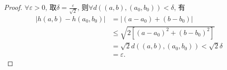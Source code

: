 \begin{proof}
    


    $\forall \varepsilon > 0$, 取$\delta = \frac{\varepsilon}{\sqrt{2}}$, 则$\forall d\left( \left( a,b \right) ,\left( a_0,b_0 \right)  \right) < \delta$, 有
    \begin{equation}
        \begin{aligned}
            \left| h\left( a,b \right) - h\left( a_0,b_0 \right)  \right| 
            & = \left| \left( a-a_0 \right) +\left( b-b_0 \right)  \right|
            \\
            & \le \sqrt{2 \left[ \left( a-a_0 \right) ^{2} + \left( b-b_0 \right) ^{2} \right] } 
            \\
            & = \sqrt{2} d\left( \left( a,b \right) ,\left( a_0,b_0 \right)  \right) < \sqrt{2} \delta
            \\
            & = \varepsilon.
          \end{aligned}
    \end{equation}


\begin{tikzpicture}[x=0.75pt,y=0.75pt,yscale=-1,xscale=1]


\end{tikzpicture}
\end{proof}
